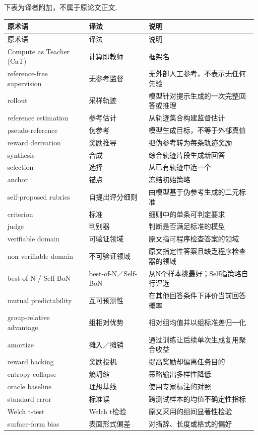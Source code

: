 \label{cat-glossary}
下表为译者附加，不属于原论文正文.
\begin{longtable}{p{}p{}p{}}\toprule
原术语&译法&说明\\\midrule
\endfirsthead
\toprule 原术语&译法&说明\\\midrule
\endhead
Compute as Teacher (CaT)&计算即教师&框架名\\
reference-free supervision&无参考监督&无外部人工参考，不表示无任何先验\\
rollout&采样轨迹&模型针对提示生成的一次完整回答或推理\\
reference estimation&参考估计&从轨迹集合构建监督估计\\
pseudo-reference&伪参考&模型生成目标，不等于外部真值\\
reward derivation&奖励推导&把伪参考转为每条轨迹奖励\\
synthesis&合成&综合轨迹片段生成新回答\\
selection&选择&从已有轨迹中选一个\\
anchor&锚点&冻结初始策略\\
self-proposed rubrics&自提出评分细则&由模型基于伪参考生成的二元标准\\
criterion&标准&细则中的单条可判定要求\\
judge&判别器&判断是否满足标准的模型\\
verifiable domain&可验证领域&原文指可程序检查答案的领域\\
non-verifiable domain&不可验证领域&原文指定性答案且缺乏程序检查器的领域\\
best-of-N / Self-BoN&best-of-N／Self-BoN&从N个样本挑最好；Self指策略自行评选\\
mutual predictability&互可预测性&在其他回答条件下评价当前回答概率\\
group-relative advantage&组相对优势&相对组均值并以组标准差归一化\\
amortize&摊入／摊销&通过训练让后续单次生成复用聚合收益\\
reward hacking&奖励投机&提高奖励却偏离任务目的\\
entropy collapse&熵坍缩&策略输出多样性降低\\
oracle baseline&理想基线&使用专家标注的对照\\
standard error&标准误&跨测试样本的均值不确定性指标\\
Welch t-test&Welch t检验&原文采用的组间显著性检验\\
surface-form bias&表面形式偏差&对措辞、长度或格式的偏好\\
\bottomrule\end{longtable}
